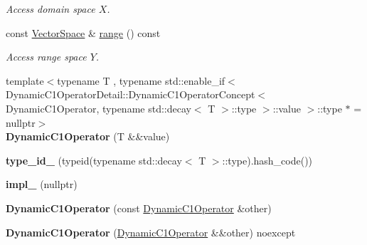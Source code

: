 \begin{DoxyCompactItemize}
\begin{DoxyCompactList}\small\item\em \-Access domain space $X$. \end{DoxyCompactList}\item 
\hypertarget{classSpacy_1_1DynamicC1Operator_a15daaabb27566457a0a3df02a13f9d96}{const \hyperlink{classSpacy_1_1VectorSpace}{\-Vector\-Space} \& \hyperlink{classSpacy_1_1DynamicC1Operator_a15daaabb27566457a0a3df02a13f9d96}{range} () const }\label{classSpacy_1_1DynamicC1Operator_a15daaabb27566457a0a3df02a13f9d96}

\begin{DoxyCompactList}\small\item\em \-Access range space $Y$. \end{DoxyCompactList}\item 
\hypertarget{classSpacy_1_1DynamicC1Operator_a9eeca088eb41c043b63c4b583f56d5ff}{{\footnotesize template$<$typename T , typename std\-::enable\-\_\-if$<$ Dynamic\-C1\-Operator\-Detail\-::\-Dynamic\-C1\-Operator\-Concept$<$ Dynamic\-C1\-Operator, typename std\-::decay$<$ T $>$\-::type $>$\-::value $>$\-::type $\ast$  = nullptr$>$ }\\{\bfseries \-Dynamic\-C1\-Operator} (\-T \&\&value)}\label{classSpacy_1_1DynamicC1Operator_a9eeca088eb41c043b63c4b583f56d5ff}

\item 
\hypertarget{classSpacy_1_1DynamicC1Operator_ac862d3ea9b16c4f684ed1b27aba77f7a}{{\bfseries type\-\_\-id\-\_\-} (typeid(typename std\-::decay$<$ \-T $>$\-::type).hash\-\_\-code())}\label{classSpacy_1_1DynamicC1Operator_ac862d3ea9b16c4f684ed1b27aba77f7a}

\item 
\hypertarget{classSpacy_1_1DynamicC1Operator_a3bcd6634f3a8a7fa9e479675afed0573}{{\bfseries impl\-\_\-} (nullptr)}\label{classSpacy_1_1DynamicC1Operator_a3bcd6634f3a8a7fa9e479675afed0573}

\item 
\hypertarget{classSpacy_1_1DynamicC1Operator_a9df9aeab7bcd5710f379516fa8f7772d}{{\bfseries \-Dynamic\-C1\-Operator} (const \hyperlink{classSpacy_1_1DynamicC1Operator}{\-Dynamic\-C1\-Operator} \&other)}\label{classSpacy_1_1DynamicC1Operator_a9df9aeab7bcd5710f379516fa8f7772d}

\item 
\hypertarget{classSpacy_1_1DynamicC1Operator_a0a5cb4d86215d268560bebcf89e8fc42}{{\bfseries \-Dynamic\-C1\-Operator} (\hyperlink{classSpacy_1_1DynamicC1Operator}{\-Dynamic\-C1\-Operator} \&\&other) noexcept}\label{classSpacy_1_1DynamicC1Operator_a0a5cb4d86215d268560bebcf89e8fc42}


\end{DoxyCompactItemize}
